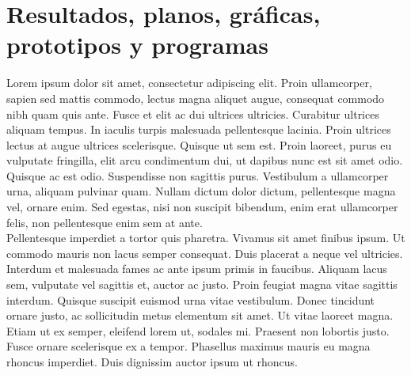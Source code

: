 \documentclass[letterpaper,oneside,openany,11pt]{book}
\begin{document}



\chapter{Resultados, planos, gráficas, prototipos y programas}\label{cap.resultados}
\noindent Lorem ipsum dolor sit amet, consectetur adipiscing elit. Proin ullamcorper, sapien sed mattis commodo, lectus magna aliquet augue, consequat commodo nibh quam quis ante. Fusce et elit ac dui ultrices ultricies. Curabitur ultrices aliquam tempus. In iaculis turpis malesuada pellentesque lacinia. Proin ultrices lectus at augue ultrices scelerisque. Quisque ut sem est. Proin laoreet, purus eu vulputate fringilla, elit arcu condimentum dui, ut dapibus nunc est sit amet odio. Quisque ac est odio. Suspendisse non sagittis purus. Vestibulum a ullamcorper urna, aliquam pulvinar quam. Nullam dictum dolor dictum, pellentesque magna vel, ornare enim. Sed egestas, nisi non suscipit bibendum, enim erat ullamcorper felis, non pellentesque enim sem at ante. \\

Pellentesque imperdiet a tortor quis pharetra. Vivamus sit amet finibus ipsum. Ut commodo mauris non lacus semper consequat. Duis placerat a neque vel ultricies. Interdum et malesuada fames ac ante ipsum primis in faucibus. Aliquam lacus sem, vulputate vel sagittis et, auctor ac justo. Proin feugiat magna vitae sagittis interdum. Quisque suscipit euismod urna vitae vestibulum. Donec tincidunt ornare justo, ac sollicitudin metus elementum sit amet. Ut vitae laoreet magna. Etiam ut ex semper, eleifend lorem ut, sodales mi. Praesent non lobortis justo. Fusce ornare scelerisque ex a tempor. Phasellus maximus mauris eu magna rhoncus imperdiet. Duis dignissim auctor ipsum ut rhoncus. \\
\end{document}

